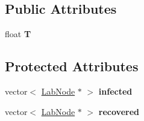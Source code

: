 \subsection*{Public Attributes}
\begin{DoxyCompactItemize}
\item 
\hypertarget{classstudy_1_1_percolation___sim_a3f6e447f078796382e7a12a7af801bc4}{float {\bfseries T}}\label{classstudy_1_1_percolation___sim_a3f6e447f078796382e7a12a7af801bc4}

\end{DoxyCompactItemize}
\subsection*{Protected Attributes}
\begin{DoxyCompactItemize}
\item 
\hypertarget{classstudy_1_1_percolation___sim_af1df83863bea9ee44df965836d1068bf}{vector$<$ \hyperlink{classelps_1_1_lab_node}{Lab\+Node} $\ast$ $>$ {\bfseries infected}}\label{classstudy_1_1_percolation___sim_af1df83863bea9ee44df965836d1068bf}

\item 
\hypertarget{classstudy_1_1_percolation___sim_a0c4b8745bb7581727438eb20597bba17}{vector$<$ \hyperlink{classelps_1_1_lab_node}{Lab\+Node} $\ast$ $>$ {\bfseries recovered}}\label{classstudy_1_1_percolation___sim_a0c4b8745bb7581727438eb20597bba17}

\end{DoxyCompactItemize}
